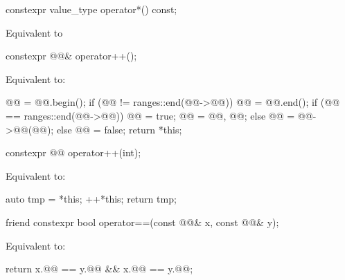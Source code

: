 \begin{itemdecl}
constexpr value_type operator*() const;
\end{itemdecl}

\begin{itemdescr}
\pnum
\effects
Equivalent to 
\end{itemdescr}

\begin{itemdecl}
constexpr @@& operator++();
\end{itemdecl}

\begin{itemdescr}
\pnum
\effects
Equivalent to:
\begin{codeblock}
@@ = @@.begin();
if (@@ != ranges::end(@@->@@)) {
  @@ = @@.end();
  if (@@ == ranges::end(@@->@@)) {
    @@ = true;
    @@ = {@@, @@};
  } else {
    @@ = @@->@@(@@);
  }
} else {
  @@ = false;
}
return *this;
\end{codeblock}
\end{itemdescr}

\begin{itemdecl}
constexpr @@ operator++(int);
\end{itemdecl}

\begin{itemdescr}
\pnum
\effects
Equivalent to:
\begin{codeblock}
auto tmp = *this;
++*this;
return tmp;
\end{codeblock}
\end{itemdescr}

\begin{itemdecl}
friend constexpr bool operator==(const @@& x, const @@& y);
\end{itemdecl}

\begin{itemdescr}
\pnum
\effects
Equivalent to:
\begin{codeblock}
return x.@@ == y.@@ && x.@@ == y.@@;
\end{codeblock}
\end{itemdescr}


